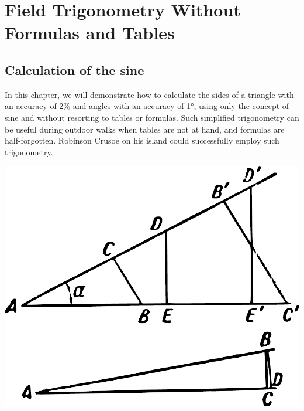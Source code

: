

\chapter{Field Trigonometry Without Formulas and Tables}
\label{ch-05}
	
\section{Calculation of the sine}
\label{sec-5.1}

In this chapter, we will demonstrate how to calculate the sides of a triangle with an accuracy of 2\% and angles with an accuracy of \ang{1}, using only the concept of sine and without resorting to tables or formulas. Such simplified trigonometry can be useful during outdoor walks when tables are not at hand, and formulas are half-forgotten. Robinson Crusoe on his island could successfully employ such trigonometry.
\begin{marginfigure}%
\centering
\includegraphics[width=\textwidth]{figures/ch-05/fig-088.pdf}
\end{marginfigure}

